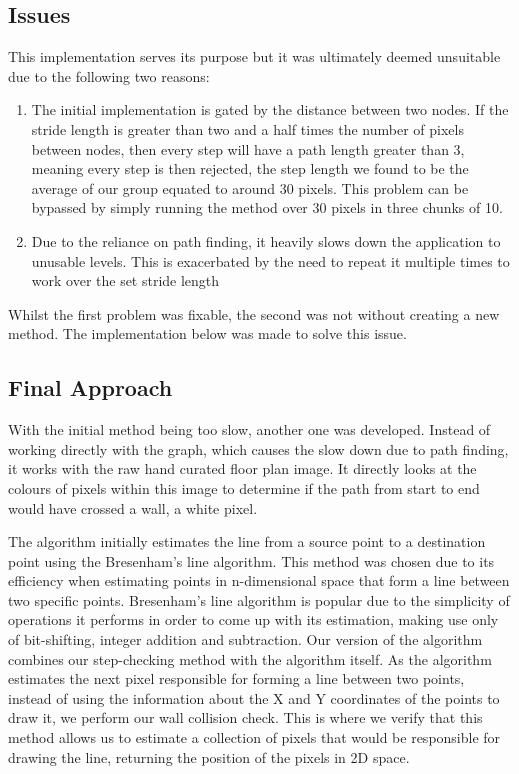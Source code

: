 \documentclass[12pt,a4paper]{report}
\begin{document}
\subsection{Issues}

This implementation serves its purpose but it was ultimately deemed unsuitable due to the following two reasons:

\begin{enumerate}
	\item The initial implementation is gated by the distance between two nodes. If the stride length is greater than two and a half times the number of pixels between nodes, then every step will have a path length greater than 3, meaning every step is then rejected, the step length we found to be the average of our group equated to around 30 pixels. This problem can be bypassed by simply running the method over 30 pixels in three chunks of 10.
	\item Due to the reliance on path finding, it heavily slows down the application to unusable levels. This is exacerbated by the need to repeat it multiple times to work over the set stride length
\end{enumerate}

Whilst the first problem was fixable, the second was not without creating a new method. The implementation below was made to solve this issue.

\subsection{Final Approach}

With the initial method being too slow, another one was developed. Instead of working directly with the graph, which causes the slow down due to path finding, it works with the raw hand curated floor plan image. It directly looks at the colours of pixels within this image to determine if the path from start to end would have crossed a wall, a white pixel.

The algorithm initially estimates the line from a source point to a destination point using the Bresenham's line algorithm\cite{algoBresenhamLine}. This method was chosen due to its efficiency when estimating points in n-dimensional space that form a line between two specific points. Bresenham's line algorithm is popular due to the simplicity of operations it performs in order to come up with its estimation, making use only of bit-shifting, integer addition and subtraction. Our version of the algorithm combines our step-checking method with the algorithm itself. As the algorithm estimates the next pixel responsible for forming a line between two points, instead of using the information about the X and Y coordinates of the points to draw it, we perform our wall collision check. This is where we verify that this method allows us to estimate a collection of pixels that would be responsible for drawing the line, returning the position of the pixels in 2D space. 
\end{document}
